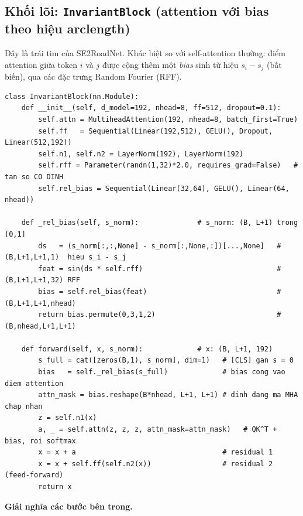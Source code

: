 \documentclass[11pt]{article}
\newcommand{\code}[1]{\textcolor{cInk}{\texttt{#1}}}
\theoremstyle{definition}
\begin{document}
\subsection{Khối lõi: \code{InvariantBlock} (attention với bias theo hiệu
arclength)}
\label{sec:invblock}
Đây là trái tim của SE2RoadNet. Khác biệt so với self-attention thường: điểm
attention giữa token $i$ và $j$ được cộng thêm một \emph{bias} sinh từ hiệu
$s_i-s_j$ (bất biến), qua các đặc trưng Random Fourier (RFF).
\begin{lstlisting}
class InvariantBlock(nn.Module):
    def __init__(self, d_model=192, nhead=8, ff=512, dropout=0.1):
        self.attn = MultiheadAttention(192, nhead=8, batch_first=True)
        self.ff   = Sequential(Linear(192,512), GELU(), Dropout, Linear(512,192))
        self.n1, self.n2 = LayerNorm(192), LayerNorm(192)
        self.rff = Parameter(randn(1,32)*2.0, requires_grad=False)   # tan so CO DINH
        self.rel_bias = Sequential(Linear(32,64), GELU(), Linear(64, nhead))

    def _rel_bias(self, s_norm):              # s_norm: (B, L+1) trong [0,1]
        ds   = (s_norm[:,:,None] - s_norm[:,None,:])[...,None]   # (B,L+1,L+1,1)  hieu s_i - s_j
        feat = sin(ds * self.rff)                                # (B,L+1,L+1,32) RFF
        bias = self.rel_bias(feat)                               # (B,L+1,L+1,nhead)
        return bias.permute(0,3,1,2)                             # (B,nhead,L+1,L+1)

    def forward(self, x, s_norm):             # x: (B, L+1, 192)
        s_full = cat([zeros(B,1), s_norm], dim=1)   # [CLS] gan s = 0
        bias   = self._rel_bias(s_full)             # bias cong vao diem attention
        attn_mask = bias.reshape(B*nhead, L+1, L+1) # dinh dang ma MHA chap nhan
        z = self.n1(x)
        a, _ = self.attn(z, z, z, attn_mask=attn_mask)   # QK^T + bias, roi softmax
        x = x + a                                   # residual 1
        x = x + self.ff(self.n2(x))                 # residual 2 (feed-forward)
        return x
\end{lstlisting}
\textbf{Giải nghĩa các bước bên trong.}
\end{document}
